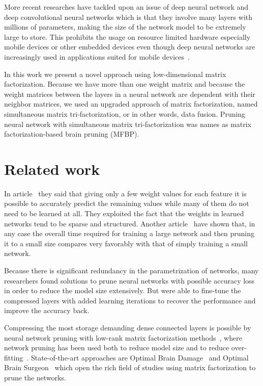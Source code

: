 \documentclass{article} %
\begin{document}
More recent researches have tackled upon an issue of deep neural network and 
deep convolutional neural networks which is that they involve many layers with 
millions of parameters, making the size of the network model to be extremely 
large to store. This prohibits the usage on resource limited hardware especially 
mobile devices or other embedded devices even though deep neural networks are 
increasingly used in applications suited for mobile 
devices~\cite{DBLP:journals/corr/GongLYB14}.

In this work we present a novel approach using low-dimensional matrix 
factorization. Because we have more than one weight matrix and because the 
weight matrices between the layers in a neural network are dependent with their 
neighbor matrices, we used an upgraded approach of matrix factorization, named 
simultaneous matrix tri-factorization, or in other words, data fusion. Pruning 
neural network with simultaneous matrix tri-factorization was names as matrix 
factorization-based brain pruning (MFBP).

\section{Related work}
In article~\cite{denil2013predicting} they said that giving only a few weight 
values for each feature it is possible to accurately predict the remaining 
values while many of them do not need to be learned at all. They exploited the 
fact that the weights in learned networks tend to be sparse and structured.
Another article~\cite{augasta2013pruning} have shown that, in any case the 
overall time required for training a large network and then pruning it to a 
small size compares very favorably with that of simply training a small network. 
 
Because there 
is significant redundancy in the parametrization of networks, many researchers 
found solutions to prune neural networks with possible accuracy loss in order to 
reduce the model size extensively. But were able to fine-tune the compressed 
layers with added learning iterations to recover the performance and improve the 
accuracy back. 

Compressing the most storage 
demanding dense connected layers is possible by neural network pruning with 
low-rank matrix factorization methods~\cite{bondarenko2014artificial, 
schmidhuber2015deep, sainath2013low}, where network pruning has been used both 
to reduce model size and to reduce over-fitting~\cite{han2015learning}. 
State-of-the-art approaches are Optimal Brain Damage~\cite{lecun1989optimal} and 
Optimal Brain Surgeon~\cite{hassibi1993optimal} which open the rich field of 
studies using matrix factorization to prune the networks. 
\end{document}
